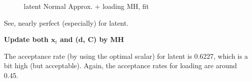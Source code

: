\documentclass[]{article}
\begin{document}
\begin{figure}[h!]
	\caption{latent Normal Approx. + loading MH, fit}
	\label{dc MH: fit}
\end{figure}

See, nearly perfect (especially) for latent.

\textbf{Update both \(\mathbf{x}_t\) and (\(\mathbf{d}\), \(\mathbf{C}\)) by MH}

The acceptance rate (by using the optimal scalar) for latent is 0.6227, which is a bit high (but acceptable). Again, the acceptance rates for loading are around 0.45.
\end{document}
